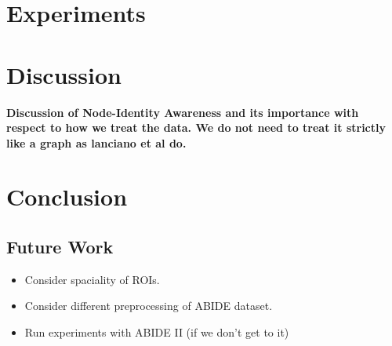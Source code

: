 \documentclass[letterpaper]{article}
\begin{document}
\section{Experiments}



\section{Discussion}
\textbf{Discussion of Node-Identity Awareness and its importance with respect to how we treat the data. We do not need to treat it strictly like a graph as lanciano et al do.}


\section{Conclusion}


\subsection{Future Work}
\begin{itemize}
    \item Consider spaciality of ROIs.
    \item Consider different preprocessing of ABIDE dataset.
    \item Run experiments with ABIDE II (if we don't get to it)
\end{itemize}



\appendix


\end{document}
